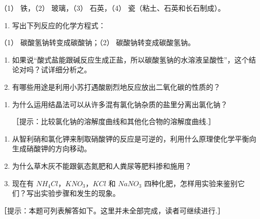 （1） 铁，（2） 玻璃，（3） 石英，（4） 瓷（粘土、石英和长石制成）。

\begin{enumerate}[start=6]
\item
  写出下列反应的化学方程式：
\end{enumerate}

（1） 碳酸氢钠转变成碳酸钠；（2） 碳酸钠转变成碳酸氢钠。

\begin{enumerate}[start=7]
\item
  如果说``酸式盐能跟碱反应生成正盐，所以碳酸氢钠的水溶液呈酸性''，这个结论对吗？试详细分析之。
\item
  有哪些用途是利用小苏打遇酸剧烈地反应放出二氧化碳的性质的？
\end{enumerate}

\begin{enumerate}[start=9,label={*\arabic*.}]
\item
  为什么运用结晶法可以从许多混有氯化钠杂质的盐里分离出氯化钠？

［提示：比较氯化钠的溶解度曲线和其他化合物的溶解度曲线.］

\end{enumerate}
\begin{enumerate}[start=10]
\item
  从智利硝和氯化钾来制取硝酸钾的反应是可逆的，利用什么原理使化学平衡向生成硝酸钾的方向移动。
\item
  为什么草木灰不能跟氨态氮肥和人粪尿等肥料掺和施用？
\item
  现在有 \(NH_{4}Cl\)，\(KNO_{3}\)，\(KCl\) 和 \(NaNO_{3}\)
  四种化肥，怎样用实验来鉴别它们？写出实验步骤和发生的现象。
\end{enumerate}

［提示：本题可列表解答如下。这里并未全部完成，读者可继续进行.］

